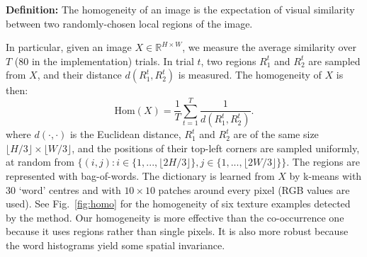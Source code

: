 \noindent 
\textbf{Definition:} The homogeneity of an image is the expectation of
visual similarity between two randomly-chosen local regions of the image.

In particular, given an image $X \in \mathbb{R}^{H\times W}$, we
measure the average similarity over $T$ ($80$ in the implementation)
trials.  In trial $t$, two regions $R_1^t$ and $R_2^t$ are sampled
from $X$, and their distance $d(R_1^t, R_2^t)$ is measured. The
homogeneity of $X$ is then:
\begin{equation}
  \label{eq:repet}
\text{Hom}(X) = \frac{1}{T}\sum_{t=1}^T \frac{1}{d(R_1^t, R_2^t)}.  
\end{equation}
where $d(\cdot, \cdot)$ is the Euclidean distance, $R_1^t$ and $R_2^t$
are of the same size $\lfloor H/3 \rfloor \times \lfloor W/3 \rfloor$,
and the positions of their top-left corners are sampled uniformly, at
random from $\{(i,j): i\in\{1, ..., \lfloor 2H/3 \rfloor \}, j\in \{1,
..., \lfloor 2W/3 \rfloor \} \}$.  The regions are represented with
bag-of-words. The dictionary is learned from $X$ by k-means with $30$
`word' centres and with $10\times 10$ patches around every pixel (RGB
values are used). See Fig.~\ref{fig:homo} for the homogeneity of six
texture examples detected by the method.  Our homogeneity is more
effective than the co-occurrence one ~\citep{texture:analysis} because
it uses regions rather than single pixels. It is also more robust
because the word histograms yield some spatial invariance. 
 


